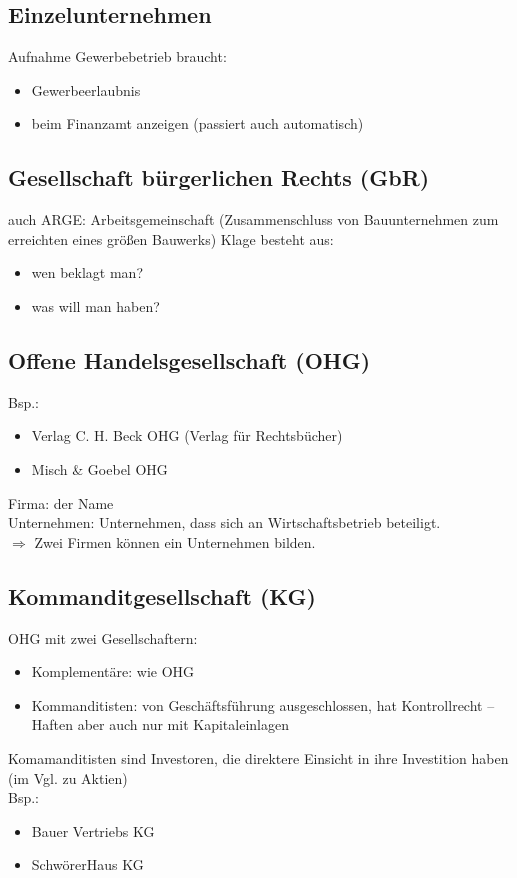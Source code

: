 \documentclass{scrreprt}
\begin{document}
\subsection{Einzelunternehmen}
Aufnahme Gewerbebetrieb braucht:
\begin{itemize}
\item Gewerbeerlaubnis
\item beim Finanzamt anzeigen (passiert auch automatisch)
\end{itemize}
\subsection{Gesellschaft bürgerlichen Rechts (GbR)}
auch ARGE: Arbeitsgemeinschaft (Zusammenschluss von Bauunternehmen zum erreichten eines größen Bauwerks)
Klage besteht aus:
\begin{itemize}
\item wen beklagt man?
\item was will man haben?
\end{itemize}
\subsection{Offene Handelsgesellschaft (OHG)}
Bsp.: 
\begin{itemize}
\item Verlag C. H. Beck OHG (Verlag für Rechtsbücher)
\item Misch \& Goebel OHG
\end{itemize}
Firma: der Name\\
Unternehmen: Unternehmen, dass sich an Wirtschaftsbetrieb beteiligt.\\
$ \Rightarrow $ Zwei Firmen können ein Unternehmen bilden.

\subsection{Kommanditgesellschaft (KG)}
OHG mit zwei Gesellschaftern:
\begin{itemize}
\item Komplementäre: wie OHG
\item Kommanditisten: von Geschäftsführung ausgeschlossen, hat Kontrollrecht -- Haften aber auch nur mit Kapitaleinlagen
\end{itemize}
Komamanditisten sind Investoren, die direktere Einsicht in ihre Investition haben (im Vgl. zu Aktien)\\
Bsp.:
\begin{itemize}
\item Bauer Vertriebs KG
\item SchwörerHaus KG
\end{itemize}
\end{document}
